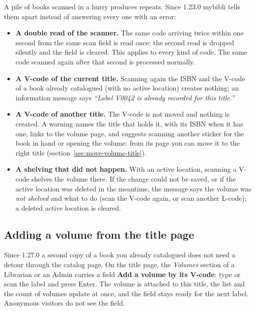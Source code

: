 A pile of books scanned in a hurry produces repeats. Since 1.23.0
mybibli tells them apart instead of answering every one with an error:

\begin{itemize}
  \item \textbf{A double read of the scanner.} The same code arriving
        twice within one second from the same scan field is read
        once: the second read is dropped silently and the field is
        cleared. This applies to every kind of code. The same code
        scanned again after that second is processed normally.
  \item \textbf{A V-code of the current title.} Scanning again the
        ISBN and the V-code of a book already catalogued (with no
        active location) creates nothing; an information message says
        \emph{``Label V0042 is already recorded for this title.''}
  \item \textbf{A V-code of another title.} The V-code is not moved
        and nothing is created. A warning names the title that holds
        it, with its ISBN when it has one, links to the volume page,
        and suggests scanning another sticker for the book in hand or
        opening the volume: from its page you can move it to the right
        title (section~\ref{sec:move-volume-title}).
  \item \textbf{A shelving that did not happen.} With an active
        location, scanning a V-code shelves the volume there. If the
        change could not be saved, or if the active location was
        deleted in the meantime, the message says the volume was
        \emph{not shelved} and what to do (scan the V-code again, or
        scan another L-code); a deleted active location is cleared.
\end{itemize}

\subsection*{Adding a volume from the title page}
\label{sec:title-add-volume}

Since 1.27.0 a second copy of a book you already catalogued does not
need a detour through the catalog page. On the title page, the
\emph{Volumes} section of a Librarian or an Admin carries a field
\textbf{Add a volume by its V-code}: type or scan the label and press
Enter. The volume is attached to this title, the list and the count of
volumes update at once, and the field stays ready for the next label.
Anonymous visitors do not see the field.

